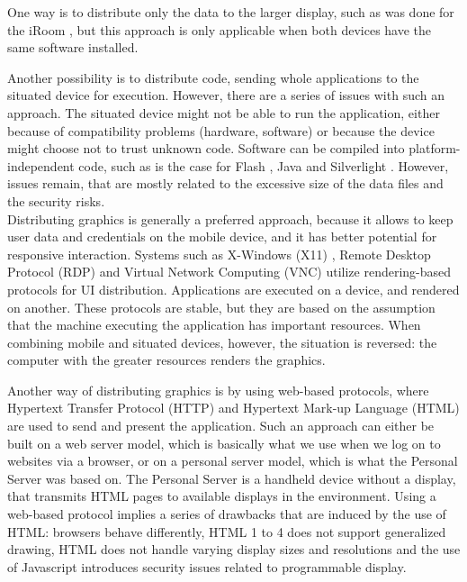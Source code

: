 One way is to distribute only the data to the larger display, such as was done for the iRoom \citep{Johanson:2002:iroom}, but this approach is only applicable when both devices have the same software installed.

Another possibility is to distribute code, sending whole applications to the situated device for execution.
However, there are a series of issues with such an approach.
The situated device might not be able to run the application, either because of compatibility problems (hardware, software) or because the device might choose not to trust unknown code.
Software can be compiled into platform-independent code, such as is the case for Flash \citep{flash}, Java \citep{java} and Silverlight \citep{silverlight}.
However, issues remain, that are mostly related to the excessive size of the data files and the security risks.
\\
\linebreak
Distributing graphics is generally a preferred approach, because it allows to keep user data and credentials on the mobile device, and it has better potential for responsive interaction.
Systems such as X-Windows (X11) \citep{Scheifler:1986:x11}, Remote Desktop Protocol (RDP) \citep{Tritsch:2003:rdp} and Virtual Network Computing (VNC) \citep{Richardson:1998:vnc} utilize rendering-based protocols for UI distribution.
Applications are executed on a device, and rendered on another.
These protocols are stable, but they are based on the assumption that the machine executing the application has important resources.
When combining mobile and situated devices, however, the situation is reversed: the computer with the greater resources renders the graphics.

Another way of distributing graphics is by using web-based protocols, where Hypertext Transfer Protocol (HTTP) and Hypertext Mark-up Language (HTML) are used to send and present the application.
Such an approach can either be built on a web server model, which is basically what we use when we log on to websites via a browser, or on a personal server model, which is what the Personal Server \citep{Want:2002:personalserver} was based on.
The Personal Server is a handheld device without a display, that transmits HTML pages to available displays in the environment.
Using a web-based protocol implies a series of drawbacks that are induced by the use of HTML: browsers behave differently, HTML 1 to 4 does not support generalized drawing, HTML does not handle varying display sizes and resolutions and the use of Javascript introduces security issues related to programmable display.

